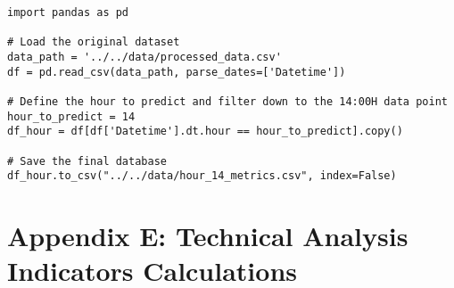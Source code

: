 \documentclass[12pt]{report} %
\begin{document}
\begin{lstlisting}
import pandas as pd

# Load the original dataset
data_path = '../../data/processed_data.csv'
df = pd.read_csv(data_path, parse_dates=['Datetime'])

# Define the hour to predict and filter down to the 14:00H data point
hour_to_predict = 14
df_hour = df[df['Datetime'].dt.hour == hour_to_predict].copy()

# Save the final database
df_hour.to_csv("../../data/hour_14_metrics.csv", index=False)
\end{lstlisting}




\chapter* {Appendix E: Technical Analysis Indicators Calculations}
\label{app:appendix_e_ta_feature_calculations}
\end{document}

